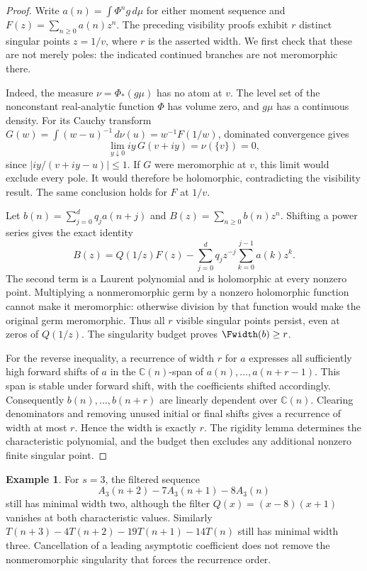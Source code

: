 \documentclass[11pt,a4paper]{article}
\theoremstyle{definition}
\newtheorem{example}[theorem]{Example}
\theoremstyle{remark}
\numberwithin{equation}{section}
\begin{document}
\begin{proof}
Write $a(n)=\int\Phi^n g\,d\mu$ for either moment sequence and
$F(z)=\sum_{n\ge0}a(n)z^n$. The preceding visibility proofs exhibit $r$
distinct singular points $z=1/v$, where $r$ is the asserted width. We first
check that these are not merely poles: the indicated continued branches are
not meromorphic there.

Indeed, the measure $\nu=\Phi_*(g\mu)$ has no atom at $v$. The level set of
the nonconstant real-analytic function $\Phi$ has volume zero, and $g\mu$
has a continuous density. For its Cauchy transform
$G(w)=\int (w-u)^{-1}\,d\nu(u)=w^{-1}F(1/w)$, dominated convergence gives
\[
 \lim_{y\downarrow0}iy\,G(v+iy)=\nu(\{v\})=0,
\]
since $|iy/(v+iy-u)|\le1$. If $G$ were meromorphic at $v$, this limit would
exclude every pole. It would therefore be holomorphic, contradicting the
visibility result. The same conclusion holds for $F$ at $1/v$.

Let $b(n)=\sum_{j=0}^{d}q_ja(n+j)$ and $B(z)=\sum_{n\ge0}b(n)z^n$.
Shifting a power series gives the exact identity
\[
 B(z)=Q(1/z)F(z)-
       \sum_{j=0}^{d}q_jz^{-j}\sum_{k=0}^{j-1}a(k)z^k.
\]
The second term is a Laurent polynomial and is holomorphic at every
nonzero point. Multiplying a nonmeromorphic germ by a nonzero holomorphic
function cannot make it meromorphic: otherwise division by that function
would make the original germ meromorphic. Thus all $r$ visible singular
points persist, even at zeros of $Q(1/z)$. The singularity budget proves
$\Fwidth(b)\ge r$.

For the reverse inequality, a recurrence of width $r$ for $a$ expresses
all sufficiently high forward shifts of $a$ in the $\mathbb C(n)$-span of
$a(n),\ldots,a(n+r-1)$. This span is stable under forward shift, with the
coefficients shifted accordingly. Consequently $b(n),\ldots,b(n+r)$
are linearly dependent over $\mathbb C(n)$. Clearing denominators and
removing unused initial or final shifts gives a recurrence of width at
most $r$. Hence the width is exactly $r$. The rigidity lemma determines
the characteristic polynomial, and the budget then excludes any additional
nonzero finite singular point.
\end{proof}

\begin{example}
For $s=3$, the filtered sequence
\[
 A_3(n+2)-7A_3(n+1)-8A_3(n)
\]
still has minimal width two, although the filter
$Q(x)=(x-8)(x+1)$ vanishes at both characteristic values. Similarly
$T(n+3)-4T(n+2)-19T(n+1)-14T(n)$ still has minimal width three.
Cancellation of a leading asymptotic coefficient does not remove the
nonmeromorphic singularity that forces the recurrence order.
\end{example}
\end{document}

